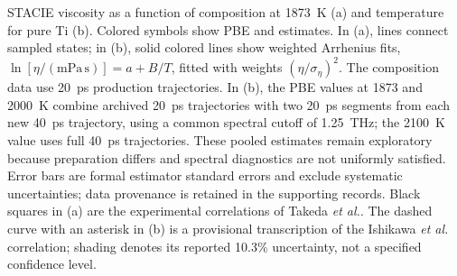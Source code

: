 \caption{STACIE viscosity as a function of composition at 1873~K (a) and temperature for pure Ti (b). Colored symbols show PBE and \rscan{} estimates. In (a), lines connect sampled states; in (b), solid colored lines show weighted Arrhenius fits, $\ln[\eta/(\mathrm{mPa\,s})]=a+B/T$, fitted with weights $(\eta/\sigma_\eta)^2$. The composition data use 20~ps production trajectories. In (b), the PBE values at 1873 and 2000~K combine archived 20~ps trajectories with two 20~ps segments from each new 40~ps trajectory, using a common spectral cutoff of 1.25~THz; the 2100~K value uses full 40~ps trajectories. These pooled estimates remain exploratory because preparation differs and spectral diagnostics are not uniformly satisfied. Error bars are formal estimator standard errors and exclude systematic uncertainties; data provenance is retained in the supporting records. Black squares in (a) are the experimental correlations of Takeda \textit{et al.}\cite{Takeda2025}. The dashed curve with an asterisk in (b) is a provisional transcription of the Ishikawa \textit{et al.}\cite{Ishikawa2012} correlation; shading denotes its reported 10.3\% uncertainty, not a specified confidence level.}
